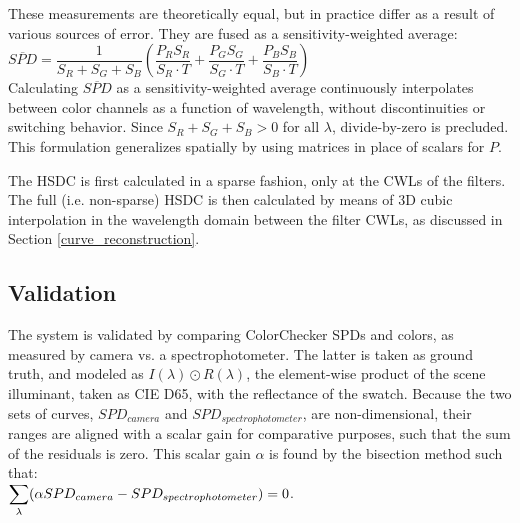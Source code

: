 \documentclass[twocolumn,10pt]{asme2ej}
\newcommand{\id}{\hspace{6 mm}}
\begin{document}
These measurements are theoretically equal, but in practice differ as a result of various sources of error. They are fused as a sensitivity-weighted average: \\

$\overline{SPD} = \dfrac{1}{S_R+S_G+S_B} \left( \dfrac{P_R S_R}{S_R \cdot T} + \dfrac{P_G S_G}{S_G \cdot T} + \dfrac{P_B S_B}{S_B \cdot T} \right)$\\



Calculating $\overline{SPD}$ as a sensitivity-weighted average continuously interpolates between color channels as a function of wavelength, without discontinuities or switching behavior. Since $S_R+S_G+S_B > 0$ for all $\lambda$, divide-by-zero is precluded. This formulation generalizes spatially by using matrices in place of scalars for $P$.

\id The HSDC is first calculated in a sparse fashion, only at the CWLs of the filters. The full (i.e. non-sparse) HSDC is then calculated by means of 3D cubic interpolation in the wavelength domain between the filter CWLs, as discussed in Section \ref{curve_reconstruction}.

\subsection{Validation}
\label{validation}

The system is validated by comparing ColorChecker SPDs and colors, as measured by camera vs. a spectrophotometer. The latter is taken as ground truth, and modeled as $I(\lambda) \odot R(\lambda)$, the element-wise product of the scene illuminant, taken as CIE D65, with the reflectance of the swatch. Because the two sets of curves, $SPD_{camera}$ and $SPD_{spectrophotometer}$, are non-dimensional, their ranges are aligned with a scalar gain for comparative purposes, such that the sum of the residuals is zero. This scalar gain $\alpha$ is found by the bisection method such that:\\

$\mathlarger{ \sum_{\lambda}} ( \alpha SPD_{camera}- SPD_{spectrophotometer} )=0$.
\end{document}
